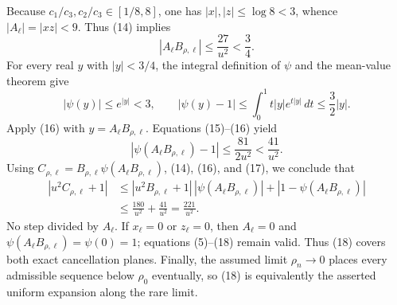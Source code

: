 Because \(c_1/c_3,c_2/c_3\in[1/8,8]\), one has \(|x|,|z|\le\log8<3\), whence \(|A_\ell|=|xz|<9\).  Thus (14) implies
\[
|A_\ell B_{\rho,\ell}|\le\frac{27}{u^2}<\frac34.
\tag{15}
\]
For every real \(y\) with \(|y|<3/4\), the integral definition of \(\psi\) and the mean-value theorem give
\[
|\psi(y)|\le e^{|y|}<3,
\qquad
|\psi(y)-1|
\le\int_0^1 t|y|e^{t|y|}\,dt
\le\frac32|y|.
\tag{16}
\]
Apply (16) with \(y=A_\ell B_{\rho,\ell}\).  Equations (15)--(16) yield
\[
\left|\psi(A_\ell B_{\rho,\ell})-1\right|
\le\frac{81}{2u^2}<\frac{41}{u^2}.
\tag{17}
\]
Using \(C_{\rho,\ell}=B_{\rho,\ell}\psi(A_\ell B_{\rho,\ell})\), (14), (16), and (17), we conclude that
\[
\begin{aligned}
|u^2C_{\rho,\ell}+1|
&\le |u^2B_{\rho,\ell}+1|\,
|\psi(A_\ell B_{\rho,\ell})|
+|1-\psi(A_\ell B_{\rho,\ell})|\\
&\le\frac{180}{u^2}+\frac{41}{u^2}
=\frac{221}{u^2}.
\end{aligned}
\tag{18}
\]
No step divided by \(A_\ell\).  If \(x_\ell=0\) or \(z_\ell=0\), then \(A_\ell=0\) and \(\psi(A_\ell B_{\rho,\ell})=\psi(0)=1\); equations (5)--(18) remain valid.  Thus (18) covers both exact cancellation planes.  Finally, the assumed limit \(\rho_n\to0\) places every admissible sequence below \(\rho_0\) eventually, so (18) is equivalently the asserted uniform expansion along the rare limit.
